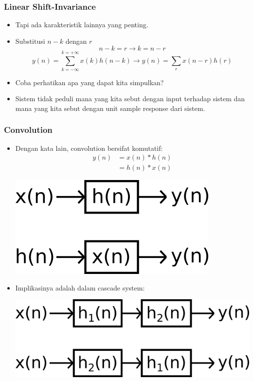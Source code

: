 \documentclass[pdflatex,compress]{beamer}
\begin{document}
\begin{frame}
	\frametitle{Linear Shift-Invariance}
	\begin{itemize}
		\item<1-> Tapi ada karakteristik lainnya yang penting.
		\item<2-> Substitusi $ n - k $ dengan $ r $
		\[ n-k = r \rightarrow k = n-r\]
		\[ y(n) = \sum_{k = -\infty}^{k = +\infty} x(k)h(n-k) \rightarrow y(n) = \sum_r x(n-r)h(r) \]
		\item<3-> Coba perhatikan apa yang dapat kita simpulkan?
		\item<4-> Sistem tidak peduli mana yang kita sebut dengan input terhadap sistem dan mana yang kita sebut dengan unit sample response dari sistem.
	\end{itemize}
\end{frame}

\begin{frame}
	\frametitle{Convolution}
	\begin{itemize}
		\item Dengan kata lain, convolution bersifat komutatif:
		\begin{align*}
			y(n) &= x(n) * h(n) \\
			&= h(n) * x(n)
		\end{align*}
		\begin{center}
			\includegraphics[width=0.3\linewidth]{img/img014}
		\end{center}
		\item Implikasinya adalah dalam cascade system:
		\begin{center}
			\includegraphics[width=0.4\linewidth]{img/img015}
		\end{center}
	\end{itemize}
\end{frame}
\end{document}
